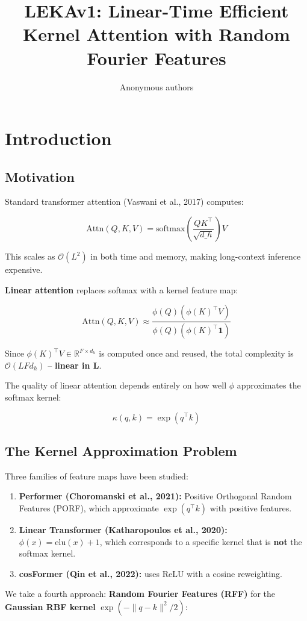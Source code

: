 \title{\textbf{LEKAv1: Linear-Time Efficient Kernel Attention with Random Fourier Features}}

\author{Anonymous authors}


\section{Introduction}

\subsection{Motivation}

Standard transformer attention (Vaswani et al., 2017) computes:

\[
\text{Attn}(Q, K, V) = \text{softmax}\!\left(\frac{Q K^\top}{\sqrt{d\_h}}\right) V
\tag{1.1}
\]

This scales as $\mathcal{O}(L^2)$ in both time and memory, making 
long-context inference expensive.

\textbf{Linear attention} replaces softmax with a kernel feature map:

\[
\text{Attn}(Q, K, V) \approx \frac{\phi(Q) \left(\phi(K)^\top V\right)}{\phi(Q) \left(\phi(K)^\top \mathbf{1}\right)}
\tag{1.2}
\]

Since $\phi(K)^\top V \in \mathbb{R}^{F \times d_h}$ is computed once and 
reused, the total complexity is $\mathcal{O}(L F d_h)$ -- \textbf{linear in L}.

The quality of linear attention depends entirely on how well $\phi$ 
approximates the softmax kernel:

\[
\kappa(q, k) = \exp(q^\top k)
\tag{1.3}
\]

\subsection{The Kernel Approximation Problem}

Three families of feature maps have been studied:

\begin{enumerate}
\item \textbf{Performer (Choromanski et al., 2021):} Positive Orthogonal Random
  Features (PORF), which approximate $\exp(q^\top k)$ with positive
  features.
\item \textbf{Linear Transformer (Katharopoulos et al., 2020):} $\phi(x) = \text{elu}(x) + 1$,
  which corresponds to a specific kernel that is \textbf{not} the softmax
  kernel.
\item \textbf{cosFormer (Qin et al., 2022):} uses $\text{ReLU}$ with a cosine
  reweighting.

\end{enumerate}
We take a fourth approach: \textbf{Random Fourier Features (RFF)} for the 
\textbf{Gaussian RBF kernel} $\exp(-\|q - k\|^2 / 2)$:

